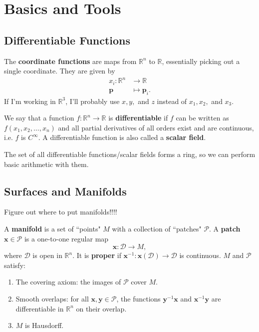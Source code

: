 \documentclass[10pt]{report}
\begin{document}
\tableofcontents


\chapter{Basics and Tools}


\section{Differentiable Functions}

The \textbf{coordinate functions} are maps from $\mathbb{R}^n$ to $\mathbb{R}$, essentially picking out a single coordinate. They are given by
\begin{align*}
	x_i : \mathbb{R}^n &\to \mathbb{R} \\
	\mathbf{p}&\mapsto \mathbf{p}_i.
\end{align*}
If I'm working in $\mathbb{R}^3$, I'll probably use $x,y,$ and $z$ instead of $x_1, x_2,$ and $x_3$.

We say that a function $f:\mathbb{R}^n \to \mathbb{R}$ is \textbf{differentiable} if $f$ can be written as $f(x_1, x_2, \dots, x_n)$ and all partial derivatives of all orders exist and are continuous, i.e. $f$ is $C^{\infty}$. A differentiable function is also called a \textbf{scalar field}.

The set of all differentiable functions/scalar fields forms a ring, so we can perform basic arithmetic with them.


\section{Surfaces and Manifolds}

{\color{red}Figure out where to put manifolds!!!!}

\begin{defn}[]
A \textbf{manifold} is a set of ``points" $M$ with a collection of ``patches" $\mathcal{P}$. A \textbf{patch} $\mathbf{x} \in \mathcal{P}$ is a one-to-one regular map
\[
\mathbf{x}:\mathcal{D}\to M,
\] where $\mathcal{D}$ is open in $\mathbb{R}^n$. {\color{red}It is \textbf{proper} if $\mathbf{x}^{-1}:\mathbf{x}(\mathcal{D})\to \mathcal{D}$ is continuous.} $M$ and $\mathcal{P}$ satisfy:
\begin{enumerate}
	\item The covering axiom: the images of $\mathcal{P}$ cover $M$.
	\item Smooth overlaps: for all $\mathbf{x},\mathbf{y} \in \mathcal{P}$, the functions $\mathbf{y}^{-1}\mathbf{x}$ and $\mathbf{x}^{-1}\mathbf{y}$ are differentiable in $\mathbb{R}^n$ on their overlap.
	\item $M$ is Hausdorff.
\end{enumerate}
\end{defn}
\end{document}
